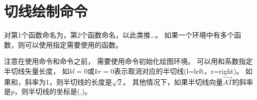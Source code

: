 \documentclass[../main.tex]{subfiles}
\begin{document}
\section{切线绘制命令}

对第1个函数命名为，第2个函数命名，以此类推\ldots。
如果一个环境中有多个函数，则可以使用指定需要使用的函数。

\tkzHandBomb 注意在使用命令和命令之前，
需要使用命令初始化绘图环境。
可以用和系数指定半切线矢量长度，
如$kl=0$或$kr=0$表示取消对应的半切线(l=left，r=right)。
如果和，斜率为1，则半切线的长度是$\sqrt{2}$。
其他情况下，如果半切线向量$\vec{AT}$的斜率是$p$，则半切线的坐标是(,)。


\end{document}
